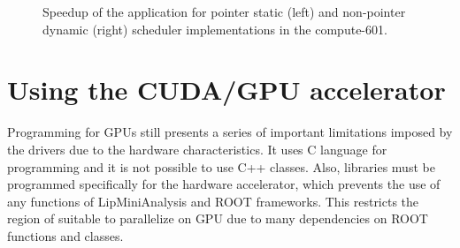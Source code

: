 \begin{figure}[!htp]
	\begin{center}
		\caption{Speedup of the \tth application for pointer static (left) and non-pointer dynamic (right) scheduler implementations in the compute-601.}
		\label{fig:Speedup601}
	\end{center}
\end{figure}

\section{Using the \nvidia CUDA/GPU accelerator}
\label{Parallelization:GPU}

Programming for GPUs still presents a series of important limitations imposed by the drivers due to the hardware characteristics. It uses C language for programming and it is not possible to use C++ classes. Also, libraries must be programmed specifically for the hardware accelerator, which prevents the use of any functions of LipMiniAnalysis and ROOT frameworks. This restricts the region of \ttDilepKinFit suitable to parallelize on GPU due to many dependencies on ROOT functions and classes.

